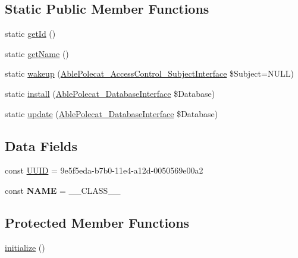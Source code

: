 \subsection*{Static Public Member Functions}
\begin{DoxyCompactItemize}
\item 
static \hyperlink{class_able_polecat___registry___class_library_acfaa3a96d0cb5a4c0d4d710dcba41e9e}{get\+Id} ()
\item 
static \hyperlink{class_able_polecat___registry___class_library_a4ef9bd37ba3ce8a13c1e8bcf4f72a630}{get\+Name} ()
\item 
static \hyperlink{class_able_polecat___registry___class_library_a3f2135f6ad45f51d075657f6d20db2cd}{wakeup} (\hyperlink{interface_able_polecat___access_control___subject_interface}{Able\+Polecat\+\_\+\+Access\+Control\+\_\+\+Subject\+Interface} \$Subject=N\+U\+L\+L)
\item 
static \hyperlink{class_able_polecat___registry___class_library_a97e9bacf538c072e0542eeb96d2475af}{install} (\hyperlink{interface_able_polecat___database_interface}{Able\+Polecat\+\_\+\+Database\+Interface} \$Database)
\item 
static \hyperlink{class_able_polecat___registry___class_library_a8398510e79e9787266fe116d6431948c}{update} (\hyperlink{interface_able_polecat___database_interface}{Able\+Polecat\+\_\+\+Database\+Interface} \$Database)
\end{DoxyCompactItemize}
\subsection*{Data Fields}
\begin{DoxyCompactItemize}
\item 
const \hyperlink{class_able_polecat___registry___class_library_a74b892c8c0b86bf9d04c5819898c51e7}{U\+U\+I\+D} = \textquotesingle{}9e5f5eda-\/b7b0-\/11e4-\/a12d-\/0050569e00a2\textquotesingle{}
\item 
\hypertarget{class_able_polecat___registry___class_library_a244352f035b82b20b0efa506167fd862}{}const {\bfseries N\+A\+M\+E} = \+\_\+\+\_\+\+C\+L\+A\+S\+S\+\_\+\+\_\+\label{class_able_polecat___registry___class_library_a244352f035b82b20b0efa506167fd862}

\end{DoxyCompactItemize}
\subsection*{Protected Member Functions}
\begin{DoxyCompactItemize}
\item 
\hyperlink{class_able_polecat___registry___class_library_a91098fa7d1917ce4833f284bbef12627}{initialize} ()
\end{DoxyCompactItemize}


